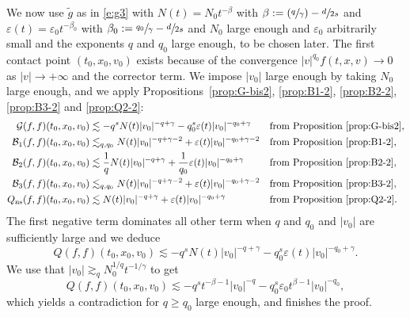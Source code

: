\documentclass[JEP,XML,SOM,Unicode,NoFloatCountersInSection]{cedram}
\newcommand{\Psfrac}[2]{(\sfrac{#1}{#2})}
\newcommand{\ns}{\mathrm{ns}}
\theoremstyle{plain}
\theoremstyle{definition}
\numberwithin{equation}{section}
\newcommand{\eps}{\varepsilon}
\let\A N
\newcommand{\Ao}{N_0}
\begin{document}
We now use $\tilde g$ as in \eqref{e:g3} with $\A(t) = \Ao t^{-\beta}$
with $\beta:=\Psfrac{q}{\gamma}-\sfrac{d}{2s}$ and
$\eps(t) = \eps_0 t^{-\beta_0}$ with
$\beta_0:=\sfrac{q_0}{\gamma}-\sfrac{d}{2s}$ and $\Ao$ large enough and
$\eps_0$ arbitrarily small and the exponents $q$ and $q_0$ large
enough, to be chosen later. The first contact point $(t_0,x_0,v_0)$
exists because of the convergence $|v|^{q_0} f(t,x,v) \to 0$ as
$|v| \to +\infty$ and the corrector term. We impose $|v_0|$ large
enough by taking $\Ao$ large enough, and we apply
Propositions~\ref{prop:G-bis2}, \ref{prop:B1-2}, \ref{prop:B2-2},
\ref{prop:B3-2} and \ref{prop:Q2-2}:
\begin{align*}
\mathcal G(f,f)(t_0,x_0,v_0)
&\lesssim - q^s \A(t) |v_0|^{-q+\gamma} - q_0^s \eps(t)
|v_0|^{-q_0+\gamma}
&& \text{from Proposition } \ref{prop:G-bis2},\\
\mathcal B_1 (f,f)(t_0,x_0,v_0)
&\lesssim_{q,q_0} \A(t) |v_0|^{-q+\gamma-2} + \eps(t)
|v_0|^{-q_0+\gamma-2}
&& \text{from Proposition } \ref{prop:B1-2}, \\
\mathcal B_2 (f,f)(t_0,x_0,v_0)
&\lesssim \frac 1 q \A(t) |v_0|^{-q+\gamma} + \frac 1 {q_0} \eps(t)
|v_0|^{-q_0+\gamma}
&& \text{from Proposition } \ref{prop:B2-2},\\
\mathcal B_3 (f,f)(t_0,x_0,v_0)
&\lesssim_{q,q_0} \A(t) |v_0|^{-q+\gamma-2} + \eps(t)
|v_0|^{-q_0+\gamma-2}
&& \text{from Proposition } \ref{prop:B3-2}, \\
Q_{\ns}(f,f)(t_0,x_0,v_0)
&\lesssim \A(t) |v_0|^{-q+\gamma} + \eps(t) |v_0|^{-q_0+\gamma}
&& \text{from Proposition } \ref{prop:Q2-2}.
\end{align*}
The first negative term dominates all other term when $q$ and $q_0$
and $|v_0|$ are sufficiently large and we deduce
\[ Q(f,f)(t_0,x_0,v_0) \lesssim -q^s \A(t) |v_0|^{-q+\gamma} - q_0^s
\eps(t)|v_0|^{-q_0+\gamma}.\] We use that
$|v_0| \gtrsim_q \Ao^{1/q} t^{-1/\gamma}$ to get
\[
Q(f,f)(t_0,x_0,v_0) \lesssim - q^s t^{-\beta-1} |v_0|^{-q} - q_0^s \eps_0
t^{\beta-1} |v_0|^{-q_0},
\]
which yields a contradiction for $q \ge q_0$ large enough, and finishes the proof.

\backmatter

\end{document}
